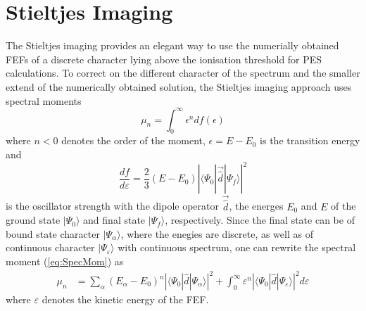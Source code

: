 \section{Stieltjes Imaging}
\label{ch:stieltjes}
The Stieltjes imaging \cite{stieltjesCeder,langhoff3,stieltjeLanczos,langhoff} provides an elegant way to use the numerially obtained FEFs of a discrete character lying above the ionisation threshold for PES calculations.%
To correct on the different character of the spectrum and the smaller extend of the numerically obtained solution, the Stieltjes imaging approach uses spectral moments \cite{langhoff2}
\begin{equation} \label{eq:SpecMom}
\mu_n=\int_0^\infty \epsilon^n df(\epsilon)
\end{equation}
where $n<0$ denotes the order of the moment, $\epsilon=E-E_0$ is the transition energy and 
\begin{equation}
\frac{df}{d\varepsilon}=\frac 23 (E-E_0) \left|\langle \Psi_0 |\vec{\hat{d}}|\Psi_f \rangle \right|^2
\end{equation}
is the oscillator strength with the dipole operator $\vec{\hat{d}}$, the energes $E_0$ and $E$ of the ground state $|\Psi_0\rangle$ and final state $|\Psi_f\rangle$, respectively.
Since the final state can be of bound state character $|\Psi_\alpha\rangle$, where the enegies are discrete, as well as of continuous character $|\Psi_\varepsilon\rangle$ with continuous spectrum, one can rewrite the spectral moment (\ref{eq:SpecMom}) as \cite{langhoff3} 
\begin{align}\label{eq:M_n_ana}
   \mu_n&=
      \sum_\alpha \left(E_\alpha-E_0\right)^n \left|\langle \Psi_0 | \hat{d}| \Psi_\alpha\rangle \right|^2 + 
         \int_{0}^\infty \varepsilon^n \left|\langle \Psi_0 | \hat{d}| \Psi_\varepsilon\rangle \right|^2 d \varepsilon
\end{align}
where $\varepsilon$ denotes the kinetic energy of the FEF.
